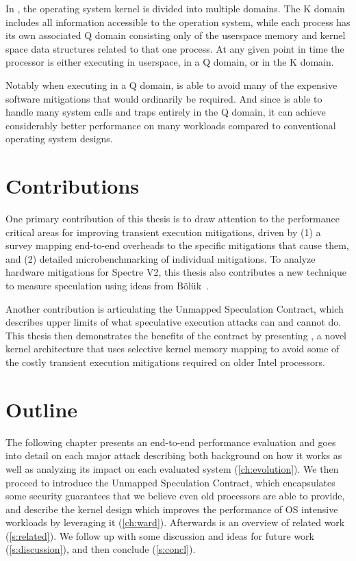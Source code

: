 In \sys, the operating system kernel is divided into multiple domains.
The K domain includes all information accessible to the operation system, while each process has its own associated Q domain consisting only of the userspace memory and kernel space data structures related to that one process.
At any given point in time the processor is either executing in userspace, in a Q domain, or in the K domain. 

Notably when executing in a Q domain, \sys is able to avoid many of the expensive software mitigations that would ordinarily be required.
And since \sys is able to handle many system calls and traps entirely in the Q domain, it can achieve considerably better performance on many workloads compared to conventional operating system designs.

\section{Contributions}

One primary contribution of this thesis is to draw attention to the performance critical areas for improving transient execution mitigations, driven by 
(1) a survey mapping end-to-end overheads to the specific mitigations that cause them, and 
(2) detailed microbenchmarking of individual mitigations.
To analyze hardware mitigations for Spectre V2, this thesis also contributes a new technique to measure speculation using ideas from Bölük~\cite{speculating-x86}.

Another contribution is articulating the Unmapped Speculation Contract, which describes upper limits of what speculative execution attacks can and cannot do.
This thesis then demonstrates the benefits of the contract
by presenting \sys{}, a novel kernel architecture that uses
selective kernel memory mapping to avoid some of the costly transient execution
mitigations required on older Intel processors.

\section{Outline}
The following chapter presents an end-to-end performance evaluation and goes into detail on each major attack describing both background on how it works as well as analyzing its impact on each evaluated system (\autoref{ch:evolution}).
We then proceed to introduce the Unmapped Speculation Contract, which encapsulates some security guarantees that we believe even old processors are able to provide, and describe the \sys kernel design which improves the performance of OS intensive workloads by leveraging it (\autoref{ch:ward}).
Afterwards is an overview of related work (\autoref{s:related}).
We follow up with some discussion and ideas for future work (\autoref{s:discussion}), and then conclude (\autoref{s:concl}).
